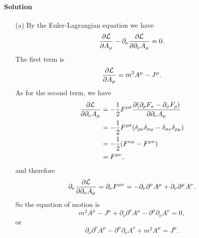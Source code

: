 \documentclass[hyperref, a4paper]{article}
\begin{document}
\paragraph{Solution} \begin{itemize}
    \item[(a)] By the Euler-Lagrangian equation we have
    \[
        \pdv{\mathcal{L}}{A_\mu} - \partial_\nu \pdv{\mathcal{L}}{\partial_\nu A_\mu} = 0.
    \] 
    The first term is 
    \[
        \pdv{\mathcal{L}}{A_\mu} = m^2 A^\mu - J^\mu.
    \]
    As for the second term, we have
    \[
        \begin{aligned}
            \pdv{\mathcal{L}}{\partial_\nu A_\mu} &= - \frac{1}{2} F^{\rho \sigma} \pdv{(\partial_\rho F_\sigma - \partial_\sigma F_\rho)}{\partial_\nu A_\mu} \\
            &= - \frac{1}{2} F^{\rho \sigma} (\delta_{\rho \nu} \delta_{\sigma \mu} - \delta_{\sigma \nu} \delta_{\rho \mu}) \\
            &= - \frac{1}{2} (F^{\nu \mu} - F^{\mu \nu}) \\
            &= F^{\mu \nu},
        \end{aligned}
    \]
    and therefore
    \[
        \partial_\nu \pdv{\mathcal{L}}{\partial_\nu A_\mu} = \partial_\nu F^{\mu \nu} = - \partial_\nu \partial^\nu A^\mu + \partial_\nu \partial^\mu A^\nu.
    \]
    So the equation of motion is
    \[
        m^2 A^\mu - J^\mu + \partial_\nu \partial^\nu A^\mu - \partial^\mu \partial_\nu A^\nu = 0,
    \]
    or 
    \begin{equation}
        \partial_\nu \partial^\nu A^\mu - \partial^\mu \partial_\nu A^\nu + m^2 A^\mu = J^\mu.
    \end{equation}


\end{itemize}
\end{document}
